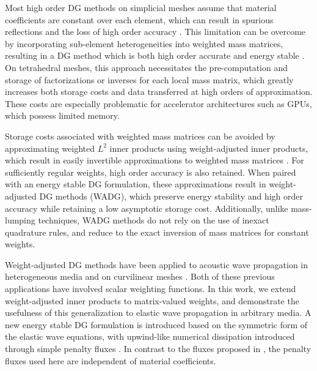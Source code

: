 \documentclass{siamart0216}
\begin{document}
Most high order DG methods on simplicial meshes assume that material coefficients are constant over each element, which can result in spurious reflections and the loss of high order accuracy \cite{castro2010seismic,mercerat2015nodal,bencomo2015discontinuous}.  This limitation can be overcome by incorporating sub-element heterogeneities into weighted mass matrices, resulting in a DG method which is both high order accurate and energy stable \cite{mercerat2015nodal, bencomo2015discontinuous}.  On tetrahedral meshes, this approach necessitates the pre-computation and storage of factorizations or inverses for each local mass matrix, which greatly increases both storage costs and data transferred at high orders of approximation.  These costs are especially problematic for accelerator architectures such as GPUs, which possess limited memory.  

Storage costs associated with weighted mass matrices can be avoided by approximating weighted $L^2$ inner products using weight-adjusted inner products, which result in easily invertible approximations to weighted mass matrices \cite{chan2016weight1,chan2016weight2}.  For sufficiently regular weights, high order accuracy is also retained.  When paired with an energy stable DG formulation, these approximations result in weight-adjusted DG methods (WADG), which preserve energy stability and high order accuracy while retaining a low asymptotic storage cost.  Additionally, unlike mass-lumping techniques, WADG methods do not rely on the use of inexact quadrature rules, and reduce to the exact inversion of mass matrices for constant weights.  

Weight-adjusted DG methods have been applied to acoustic wave propagation in heterogeneous media and on curvilinear meshes \cite{chan2016weight1,chan2016weight2}.  Both of these previous applications have involved scalar weighting functions.  In this work, we extend weight-adjusted inner products to matrix-valued weights, and demonstrate the usefulness of this generalization to elastic wave propagation in arbitrary media.  A new energy stable DG formulation is introduced based on the symmetric form of the elastic wave equations, with upwind-like numerical dissipation introduced through simple penalty fluxes \cite{warburton2013low}.  In contrast to the fluxes proposed in \cite{ye2016discontinuous}, the penalty fluxes used here are independent of material coefficients.  
\end{document}
